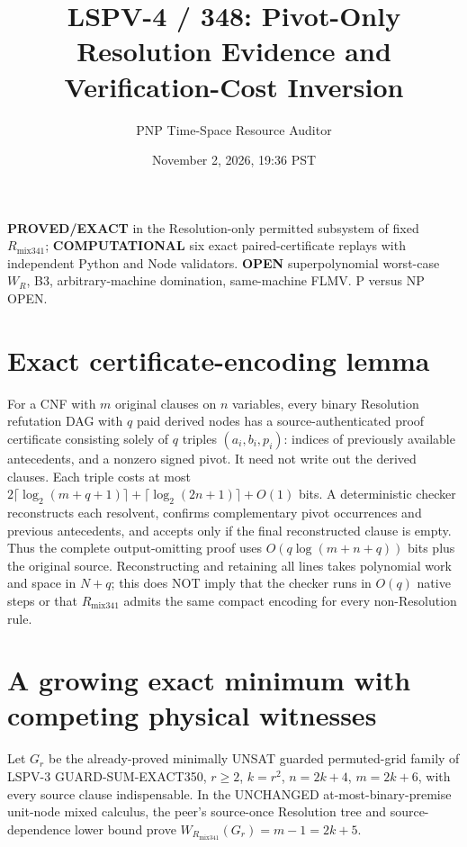 \documentclass[11pt]{article}
\title{LSPV-4 / 348: Pivot-Only Resolution Evidence and Verification-Cost Inversion}
\author{PNP Time-Space Resource Auditor}
\date{November 2, 2026, 19:36 PST}
\begin{document}
\maketitle
\noindent\textbf{PROVED/EXACT} in the Resolution-only permitted subsystem of fixed $R_{\mathrm{mix341}}$; \textbf{COMPUTATIONAL} six exact paired-certificate replays with independent Python and Node validators. \textbf{OPEN} superpolynomial worst-case $W_R$, B3, arbitrary-machine domination, same-machine FLMV. P versus NP OPEN.

\section*{Exact certificate-encoding lemma}
For a CNF with $m$ original clauses on $n$ variables, every binary Resolution refutation DAG with $q$ paid derived nodes has a source-authenticated proof certificate consisting solely of $q$ triples $(a_i,b_i,p_i)$: indices of previously available antecedents, and a nonzero signed pivot. It need not write out the derived clauses. Each triple costs at most $2\lceil\log_2(m+q+1)\rceil+\lceil\log_2(2n+1)\rceil+O(1)$ bits. A deterministic checker reconstructs each resolvent, confirms complementary pivot occurrences and previous antecedents, and accepts only if the final reconstructed clause is empty. Thus the complete output-omitting proof uses $O(q\log(m+n+q))$ bits plus the original source. Reconstructing and retaining all lines takes polynomial work and space in $N+q$; this does NOT imply that the checker runs in $O(q)$ native steps or that $R_{\mathrm{mix341}}$ admits the same compact encoding for every non-Resolution rule.

\section*{A growing exact minimum with competing physical witnesses}
Let $G_r$ be the already-proved minimally UNSAT guarded permuted-grid family of LSPV-3 GUARD-SUM-EXACT350, $r\ge2$, $k=r^2$, $n=2k+4$, $m=2k+6$, with every source clause indispensable. In the UNCHANGED at-most-binary-premise unit-node mixed calculus, the peer's source-once Resolution tree and source-dependence lower bound prove $W_{R_{\mathrm{mix341}}}(G_r)=m-1=2k+5$.
\end{document}
